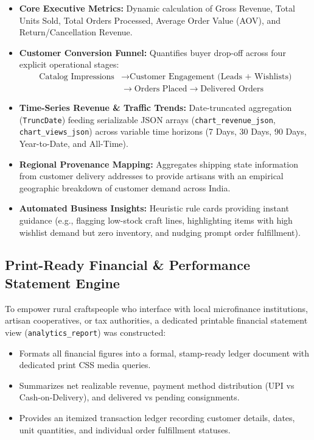 \documentclass[12pt,a4paper]{article}
\begin{document}
\begin{itemize}
    \item \textbf{Core Executive Metrics:} Dynamic calculation of Gross Revenue, Total Units Sold, Total Orders Processed, Average Order Value (AOV), and Return/Cancellation Revenue.
    \item \textbf{Customer Conversion Funnel:} Quantifies buyer drop-off across four explicit operational stages:
    \begin{equation}
        \begin{split}
            \text{Catalog Impressions} &\longrightarrow \text{Customer Engagement (Leads + Wishlists)} \\
            &\longrightarrow \text{Orders Placed} \longrightarrow \text{Delivered Orders}
        \end{split}
    \end{equation}
    \item \textbf{Time-Series Revenue \& Traffic Trends:} Date-truncated aggregation (\texttt{TruncDate}) feeding serializable JSON arrays (\texttt{chart\_revenue\_json}, \texttt{chart\_views\_json}) across variable time horizons (7 Days, 30 Days, 90 Days, Year-to-Date, and All-Time).
    \item \textbf{Regional Provenance Mapping:} Aggregates shipping state information from customer delivery addresses to provide artisans with an empirical geographic breakdown of customer demand across India.
    \item \textbf{Automated Business Insights:} Heuristic rule cards providing instant guidance (e.g., flagging low-stock craft lines, highlighting items with high wishlist demand but zero inventory, and nudging prompt order fulfillment).
\end{itemize}

\subsection{Print-Ready Financial \& Performance Statement Engine}
To empower rural craftspeople who interface with local microfinance institutions, artisan cooperatives, or tax authorities, a dedicated printable financial statement view (\texttt{analytics\_report}) was constructed:
\begin{itemize}
    \item Formats all financial figures into a formal, stamp-ready ledger document with dedicated print CSS media queries.
    \item Summarizes net realizable revenue, payment method distribution (UPI vs Cash-on-Delivery), and delivered vs pending consignments.
    \item Provides an itemized transaction ledger recording customer details, dates, unit quantities, and individual order fulfillment statuses.
\end{itemize}
\end{document}
